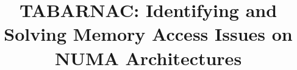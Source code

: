 \documentclass{sty/acm_proc_article-sp}
\begin{document}
\title{TABARNAC: Identifying and Solving Memory Access Issues on NUMA Architectures}

%
%
%
%
\end{document}
